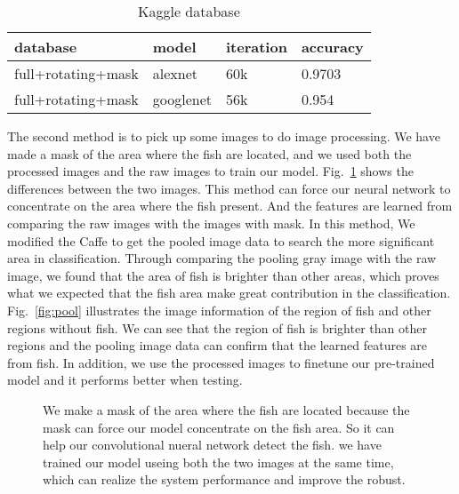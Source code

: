 \documentclass[conference]{IEEEtran}
\begin{document}
\begin{table}[!ht]
\small
\centering
\caption{Kaggle database}
\label{table:table4}
\begin{tabular}{llll}
    \toprule
    \cmidrule{1-2}
     database     &model     &iteration   &accuracy \\
	\midrule
       full+rotating+mask & alexnet   & 60k  & 0.9703  \\
       full+rotating+mask & googlenet & 56k  &0.954    \\
  
       \bottomrule
\end{tabular}
\end{table}



The second method is to pick up some images to do image processing. We have made a mask of the area where the fish are located, and we used both the processed images and the raw images to train our model. Fig.~\ref{fig:mosaic} shows the differences between the two images. This method can force our neural network to concentrate on the area where the fish present. And the features are learned from comparing the raw images with the images with mask. In this method, We modified the Caffe\cite{jia2014caffe} to get the pooled image data to search the more significant area in classification. Through comparing the pooling gray image with the raw image, we found that the area of fish is brighter than other areas, which proves what we expected that the fish area make great contribution in the classification. Fig.~\ref{fig:pool} illustrates the image information of the region of fish and other regions without fish. We can see that the region of fish is brighter than other regions and the pooling image data can confirm that the learned features are from fish. In addition, we use the processed images to finetune our pre-trained model and it performs better when testing.\par


\begin{figure}[!ht]
\centering

  
  \caption{We make a mask of the area where the fish are located because the mask can force our model concentrate on the fish area. So it can help our convolutional nueral network detect the fish. we have trained our model useing both the two images at the same time, which can realize the system performance and improve the robust.}
   \label{fig:mosaic}

\end{figure}
\end{document}
